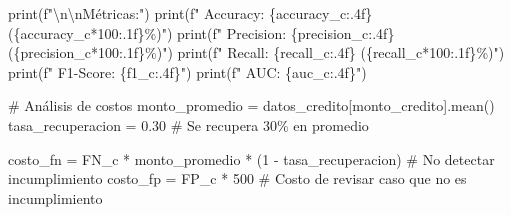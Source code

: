 \documentclass[
  doc,
  floatsintext,
  longtable,
  a4paper,
  nolmodern,
  notxfonts,
  notimes,
  12pt,
  colorlinks=true,linkcolor=blue,citecolor=blue,urlcolor=blue]{apa7}
\newenvironment{Shaded}{\begin{snugshade}}{\end{snugshade}}
\newcommand{\BuiltInTok}[1]{\textcolor[rgb]{0.00,0.23,0.31}{#1}}
\newcommand{\CharTok}[1]{\textcolor[rgb]{0.13,0.47,0.30}{#1}}
\newcommand{\CommentTok}[1]{\textcolor[rgb]{0.37,0.37,0.37}{#1}}
\newcommand{\DecValTok}[1]{\textcolor[rgb]{0.68,0.00,0.00}{#1}}
\newcommand{\FloatTok}[1]{\textcolor[rgb]{0.68,0.00,0.00}{#1}}
\newcommand{\NormalTok}[1]{\textcolor[rgb]{0.00,0.23,0.31}{#1}}
\newcommand{\OperatorTok}[1]{\textcolor[rgb]{0.37,0.37,0.37}{#1}}
\newcommand{\SpecialCharTok}[1]{\textcolor[rgb]{0.37,0.37,0.37}{#1}}
\newcommand{\SpecialStringTok}[1]{\textcolor[rgb]{0.13,0.47,0.30}{#1}}
\newcommand{\StringTok}[1]{\textcolor[rgb]{0.13,0.47,0.30}{#1}}
\begin{document}
\begin{Shaded}
\begin{Highlighting}[]
\BuiltInTok{print}\NormalTok{(}\SpecialStringTok{f"}\CharTok{\textbackslash{}n\textbackslash{}n}\SpecialStringTok{Métricas:"}\NormalTok{)}
\BuiltInTok{print}\NormalTok{(}\SpecialStringTok{f"  Accuracy:  }\SpecialCharTok{\{}\NormalTok{accuracy\_c}\SpecialCharTok{:.4f\}}\SpecialStringTok{ (}\SpecialCharTok{\{}\NormalTok{accuracy\_c}\OperatorTok{*}\DecValTok{100}\SpecialCharTok{:.1f\}}\SpecialStringTok{\%)"}\NormalTok{)}
\BuiltInTok{print}\NormalTok{(}\SpecialStringTok{f"  Precision: }\SpecialCharTok{\{}\NormalTok{precision\_c}\SpecialCharTok{:.4f\}}\SpecialStringTok{ (}\SpecialCharTok{\{}\NormalTok{precision\_c}\OperatorTok{*}\DecValTok{100}\SpecialCharTok{:.1f\}}\SpecialStringTok{\%)"}\NormalTok{)}
\BuiltInTok{print}\NormalTok{(}\SpecialStringTok{f"  Recall:    }\SpecialCharTok{\{}\NormalTok{recall\_c}\SpecialCharTok{:.4f\}}\SpecialStringTok{ (}\SpecialCharTok{\{}\NormalTok{recall\_c}\OperatorTok{*}\DecValTok{100}\SpecialCharTok{:.1f\}}\SpecialStringTok{\%)"}\NormalTok{)}
\BuiltInTok{print}\NormalTok{(}\SpecialStringTok{f"  F1{-}Score:  }\SpecialCharTok{\{}\NormalTok{f1\_c}\SpecialCharTok{:.4f\}}\SpecialStringTok{"}\NormalTok{)}
\BuiltInTok{print}\NormalTok{(}\SpecialStringTok{f"  AUC:       }\SpecialCharTok{\{}\NormalTok{auc\_c}\SpecialCharTok{:.4f\}}\SpecialStringTok{"}\NormalTok{)}

\CommentTok{\# Análisis de costos}
\NormalTok{monto\_promedio }\OperatorTok{=}\NormalTok{ datos\_credito[}\StringTok{\textquotesingle{}monto\_credito\textquotesingle{}}\NormalTok{].mean()}
\NormalTok{tasa\_recuperacion }\OperatorTok{=} \FloatTok{0.30}  \CommentTok{\# Se recupera 30\% en promedio}

\NormalTok{costo\_fn }\OperatorTok{=}\NormalTok{ FN\_c }\OperatorTok{*}\NormalTok{ monto\_promedio }\OperatorTok{*}\NormalTok{ (}\DecValTok{1} \OperatorTok{{-}}\NormalTok{ tasa\_recuperacion)  }\CommentTok{\# No detectar incumplimiento}
\NormalTok{costo\_fp }\OperatorTok{=}\NormalTok{ FP\_c }\OperatorTok{*} \DecValTok{500}  \CommentTok{\# Costo de revisar caso que no es incumplimiento}


\end{Highlighting}
\end{Shaded}
\end{document}
